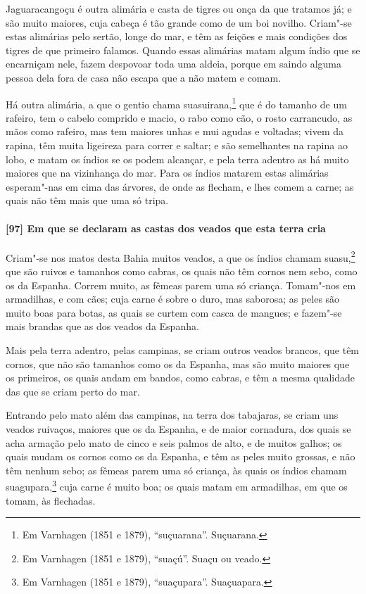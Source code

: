 \begin{linenumbers}
Jaguaracangoçu é outra alimária e casta de tigres ou onça da que tratamos já; e são muito
maiores, cuja cabeça é tão grande como de um boi novilho. Criam"-se estas alimárias pelo
sertão, longe do mar, e têm as feições e mais condições dos tigres de que primeiro
falamos. Quando essas alimárias matam algum índio que se encarniçam nele, fazem despovoar
toda uma aldeia, porque em saindo alguma pessoa dela fora de casa não escapa que a não
matem e comam.

Há outra alimária, a que o gentio chama suasuirana,\footnote{ Em Varnhagen (1851 e 1879),
``suçuarana''. Suçuarana.} que é do tamanho de um rafeiro, tem o cabelo comprido e macio,
o rabo como cão, o rosto carrancudo, as mãos como rafeiro, mas tem maiores unhas e mui
agudas e voltadas; vivem da rapina, têm muita ligeireza para correr e saltar; e são
semelhantes na rapina ao lobo, e matam os índios se os podem alcançar, e pela terra
adentro as há muito maiores que na vizinhança do mar. Para os índios matarem estas
alimárias esperam"-nas em cima das árvores, de onde as flecham, e lhes comem a carne; as
quais não têm mais que uma só tripa.

\paragraph{[97] Em que se declaram as castas dos veados que esta terra cria}\quad
Criam"-se nos matos desta Bahia muitos veados, a que os índios chamam suasu,\footnote{ Em
Varnhagen (1851 e 1879), ``suaçú''. Suaçu ou veado.} que são ruivos e tamanhos como
cabras, os quais não têm cornos nem sebo, como os da Espanha. Correm muito, as fêmeas
parem uma só criança. Tomam"-nos em armadilhas, e com cães; cuja carne é sobre o duro, mas
saborosa; as peles são muito boas para botas, as quais se curtem com casca de mangues; e
fazem"-se mais brandas que as dos veados da Espanha.

Mais pela terra adentro, pelas campinas, se criam outros veados brancos, que têm cornos,
que não são tamanhos como os da Espanha, mas são muito maiores que os primeiros, os quais
andam em bandos, como cabras, e têm a mesma qualidade das que se criam perto do mar.

Entrando pelo mato além das campinas, na terra dos tabajaras, se criam uns veados
ruivaços, maiores que os da Espanha, e de maior cornadura, dos quais se acha armação pelo
mato de cinco e seis palmos de alto, e de muitos galhos; os quais mudam os cornos como os
da Espanha, e têm as peles muito grossas, e não têm nenhum sebo; as fêmeas parem uma só
criança, às quais os índios chamam suagupara,\footnote{ Em Varnhagen (1851 e 1879),
``suaçupara''. Suaçuapara.} cuja carne é muito boa; os quais matam em armadilhas, em que
os tomam, às flechadas.


\end{linenumbers}
